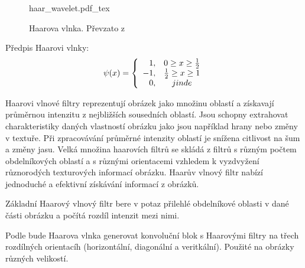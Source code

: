 \documentclass[czech,BP]{thesiskiv}
\begin{document}
\begin{figure}[H]
    \centering
    \def\svgwidth{200px}
    {haar_wavelet.pdf_tex} 
    \caption{Haarova vlnka. Převzato z \cite{HaarWiky}}
\end{figure} 

Předpis Haarovi vlnky: 
\begin{displaymath} 
	\label{haar} 
		    \psi(x) = \left\{ \begin{array}{r@{\quad}c}
    		1, & 0 \geq x \geq \frac{1}{2} \\
    		-1, & \frac{1}{2} \geq x \geq 1 \\ 
    		0, & jinde \\  \end{array} \right. 
\end{displaymath} 
\vspace{1cm}
 
\par Haarovi vlnové filtry reprezentují obrázek jako množinu oblastí a získavají průměrnou intenzitu z nejbližších sousedních oblastí. Jsou schopny extrahovat charakteristiky daných vlastností obrázku jako jsou například hrany nebo změny v textuře.  Při zpracovávání průměrné intenzity oblastí je snížena citlivost na šum a změny jasu. Velká množina haarovích filtrů se skládá z filtrů s různým počtem obdelníkových oblastí a s různými orientacemi vzhledem k vyzdvyžení různorodých texturových informací obrázku. Haarův vlnový filtr nabízí jednoduché a efektivní získávání informací z obrázků.
\par Základní Haarový vlnový filtr bere v potaz přilehlé obdelníkové oblasti v dané části obrázku a počítá rozdíl intenzit mezi nimi. 
 
\par Podle \citep{JEC} bude Haarova vlnka generovat konvoluční blok s Haarovými filtry na třech rozdílných orientacíh (horizontální, diagonální a veritkální). Použité na obrázky různých velikostí.  
 
\end{document}
